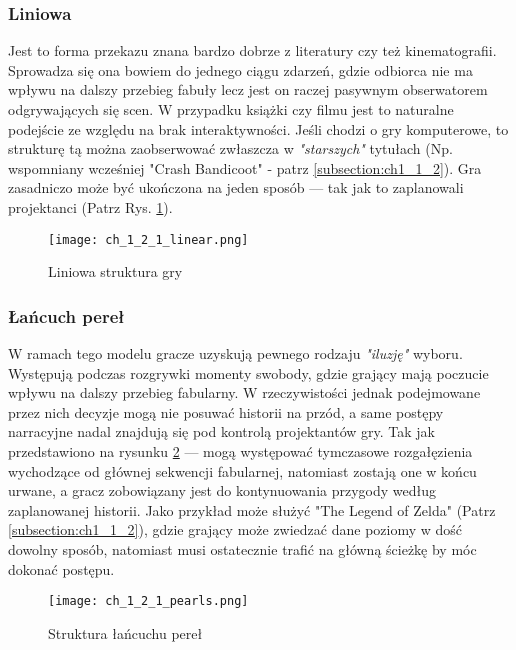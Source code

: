 \subsubsection*{Liniowa}

Jest to forma przekazu znana bardzo dobrze z literatury czy też kinematografii. Sprowadza się ona
bowiem do jednego ciągu zdarzeń, gdzie odbiorca nie ma wpływu na dalszy przebieg fabuły lecz jest
on raczej pasywnym obserwatorem odgrywających się scen. W przypadku książki czy filmu jest to
naturalne podejście ze względu na brak interaktywności. Jeśli chodzi o gry komputerowe, to
strukturę tą można zaobserwować zwłaszcza w \textit{"starszych"} tytułach (Np. wspomniany wcześniej
"Crash Bandicoot" - patrz \ref{subsection:ch1_1_2}). Gra zasadniczo może być ukończona na jeden
sposób --- tak jak to zaplanowali projektanci\cite{the_evolution_of_video_games} (Patrz Rys. \ref{fig:ch1_2_1_linear}).

\begin{figure}[h]
	\caption{Liniowa struktura gry\cite{narrative_structures}}
	\texttt{[image: ch\_1\_2\_1\_linear.png]}
	\centering
	\label{fig:ch1_2_1_linear}
\end{figure}

\subsubsection*{Łańcuch pereł}

W ramach tego modelu gracze uzyskują pewnego rodzaju \textit{"iluzję"} wyboru. Występują podczas
rozgrywki momenty swobody, gdzie grający mają poczucie wpływu na dalszy przebieg fabularny. W
rzeczywistości jednak podejmowane przez nich decyzje mogą nie posuwać historii na przód, a same
postępy narracyjne nadal znajdują się pod kontrolą projektantów gry\cite{theorising_narrative}.
Tak jak przedstawiono na rysunku \ref{fig:ch1_2_1_pearls} --- mogą występować tymczasowe rozgałęzienia
wychodzące od głównej sekwencji fabularnej, natomiast zostają one w końcu urwane, a gracz zobowiązany
jest do kontynuowania przygody według zaplanowanej historii. Jako przykład może służyć "The Legend
of Zelda" (Patrz \ref{subsection:ch1_1_2}), gdzie grający może zwiedzać dane poziomy w dość dowolny
sposób, natomiast musi ostatecznie trafić na główną ścieżkę by móc dokonać postępu.

\begin{figure}[h]
	\caption{Struktura łańcuchu pereł}
	\texttt{[image: ch\_1\_2\_1\_pearls.png]}
	\centering
	\label{fig:ch1_2_1_pearls}
\end{figure}

